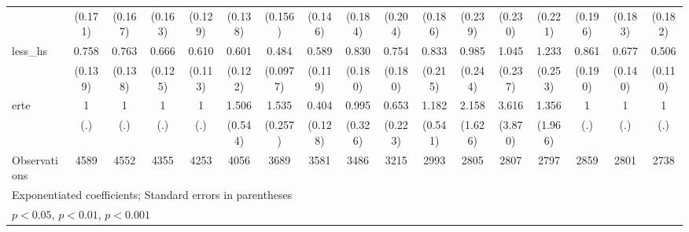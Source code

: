 {\begin{tabular}{l*{16}{c}}
                    &     (0.171)         &     (0.167)         &     (0.163)         &     (0.129)         &     (0.138)         &     (0.156)         &     (0.146)         &     (0.184)         &     (0.204)         &     (0.186)         &     (0.239)         &     (0.230)         &     (0.221)         &     (0.196)         &     (0.183)         &     (0.182)         \\
[1em]
less\_hs             &       0.758         &       0.763         &       0.666\sym{*}  &       0.610\sym{**} &       0.601\sym{*}  &       0.484\sym{***}&       0.589\sym{**} &       0.830         &       0.754         &       0.833         &       0.985         &       1.045         &       1.233         &       0.861         &       0.677         &       0.506\sym{**} \\
                    &     (0.139)         &     (0.138)         &     (0.125)         &     (0.113)         &     (0.122)         &    (0.0977)         &     (0.119)         &     (0.180)         &     (0.180)         &     (0.215)         &     (0.244)         &     (0.237)         &     (0.253)         &     (0.190)         &     (0.140)         &     (0.110)         \\
[1em]
erte                &           1         &           1         &           1         &           1         &       1.506         &       1.535\sym{*}  &       0.404\sym{**} &       0.995         &       0.653         &       1.182         &       2.158         &       3.616         &       1.356         &           1         &           1         &           1         \\
                    &         (.)         &         (.)         &         (.)         &         (.)         &     (0.544)         &     (0.257)         &     (0.128)         &     (0.326)         &     (0.223)         &     (0.541)         &     (1.626)         &     (3.870)         &     (1.966)         &         (.)         &         (.)         &         (.)         \\
\hline
Observations        &        4589         &        4552         &        4355         &        4253         &        4056         &        3689         &        3581         &        3486         &        3215         &        2993         &        2805         &        2807         &        2797         &        2859         &        2801         &        2738         \\
\hline\hline
\multicolumn{17}{l}{\footnotesize Exponentiated coefficients; Standard errors in parentheses}\\
\multicolumn{17}{l}{\footnotesize \sym{*} \(p<0.05\), \sym{**} \(p<0.01\), \sym{***} \(p<0.001\)}\\
\end{tabular}
}
